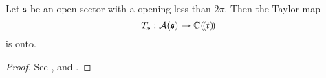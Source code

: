 \begin{thm}
  Let $\mathfrak{s}$ be an open sector with a opening less than $2\pi$.
  Then the Taylor map
  \[
    T_{\mathfrak{s}}:\mathcal{A}(\mathfrak{s})\to\mathbb{C}(\!(t)\!)
  \]
  is onto.
\end{thm}
\begin{proof}
  \begin{comment}
    \begin{itemize}
      \item \cite[Lem.II.2.2.5]{sabbah_cimpa90}: $T_I$
      \item \cite[Th.7.3]{van2003galois}: $T_I=T_{(a,b)}$
      \item \cite[Th.2.4.1]{Loday2014}: $T_{\mathfrak{s}}$
    \end{itemize}
  \end{comment}
  See \cite[Lem.II.2.2.5]{sabbah_cimpa90}, \cite[Th.7.3]{van2003galois} and
  \cite[Th.2.4.1]{Loday2014}.
\end{proof}

\begin{comment}
  \section{Sheaf definition from \cite{sabbah2007isomonodromic}}
  See \cite[II.5.c]{sabbah2007isomonodromic}.
  Let
  \begin{itemize}
    \item $D$ the open disc with coordinate $t$ centered at the origin and of
      radius $r^0>0$.
    \item $\tilde D:=[0,r^0[\times S^1$
    \item $\pi:\tilde D\to D,~(r,\theta)\mapsto t=re^{i\theta}$ 
  \end{itemize}
  \dots we can define the derivations $t\partial/\partial t$ and 
  $\bar t\partial/\partial\bar t$.
  \begin{defn}
    The sheaf of rings $\cA_{\tilde D}$ is defined as the subsheaf of
    $\sC_{\tilde D}^\infty$ of germs killed by $\bar t\partial/\partial\bar t$.
  \end{defn}
  \begin{rem}
    \cite{sabbah2007isomonodromic}: Remark 5.11
  \end{rem}
  \begin{rem}
    On the sheaf $\cA_{\tilde D}$ is defined the action of the derivation
    $\partial/\partial t$\dots
  \end{rem}
  \dots
\end{comment}
